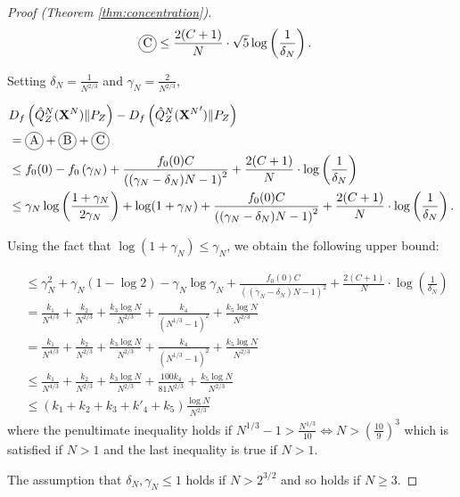 \begin{proof}[Proof (Theorem \ref{thm:concentration})]
\begin{align*}
    \encircle{C} &\leq \frac{2(C+1)}{N} \cdot \sqrt{5}\log\left(\frac{1}{\delta_N}\right).
\end{align*}


Setting $\delta_N = \frac{1}{N^{2/3}}$ and $\gamma_N = \frac{2}{N^{2/3}}$,

\begin{align*}
    &D_f\left( \hat{Q}_Z^N(\XN) \| P_Z\right) - D_f\left( \hat{Q}_Z^N({\XN}') \| P_Z\right) \\
    &= \encircle{A} + \encircle{B} + \encircle{C} \\
    &\leq f_0(0) - f_0\left(\gamma_N\right) + \frac{f_0(0)C}{\left((\gamma_N-\delta_N)N - 1\right)^2} + \frac{2(C+1)}{N} \cdot \log\left(\frac{1}{\delta_N}\right) \\
    &\leq \gamma_N \log\left(\frac{1+\gamma_N}{2\gamma_N}\right) + \log(1+\gamma_N) + \frac{f_0(0)C}{\left((\gamma_N-\delta_N)N - 1\right)^2} + \frac{2(C+1)}{N} \cdot \log\left(\frac{1}{\delta_N}\right).\\
\end{align*}

Using the fact that $\log(1+\gamma_N)\leq \gamma_N$, we obtain the following upper bound:

\begin{align*}
    &\leq \gamma_N^2 + \gamma_N(1-\log 2 ) - \gamma_N \log \gamma_N + \frac{f_0(0)C}{\left((\gamma_N-\delta_N)N - 1\right)^2} + \frac{2(C+1)}{N} \cdot \log\left(\frac{1}{\delta_N}\right)\\
    &= \frac{k_1}{N^{4/3}} + \frac{k_2}{N^{2/3}} + \frac{k_3\log N}{N^{2/3}} + \frac{k_4}{(N^{1/3} - 1)^2} +\frac{k_5 \log N }{ N^{2/3}} \\
    &= \frac{k_1}{N^{4/3}} + \frac{k_2}{N^{2/3}} + \frac{k_3\log N}{N^{2/3}} + \frac{k_4}{(N^{1/3} - 1)^2} +\frac{k_5 \log N }{ N^{2/3}} \\
    &\leq \frac{k_1}{N^{4/3}} + \frac{k_2}{N^{2/3}} + \frac{k_3\log N}{N^{2/3}} + \frac{100k_4}{81N^{2/3}} +\frac{k_5 \log N }{ N^{2/3}} \\
    &\leq (k_1+k_2+k_3+k'_4 + k_5)\frac{\log N}{N^{2/3}}
\end{align*}
where the penultimate inequality holds if $N^{1/3}-1 > \frac{N^{1/3}}{10} \iff N>\left(\frac{10}{9}\right)^3$ which is satisfied if $N>1$ and the last inequality is true if $N>1$.

The assumption that $\delta_N, \gamma_N \leq 1$ holds if $N>2^{3/2}$ and so holds if $N\geq3$.


\end{proof}
